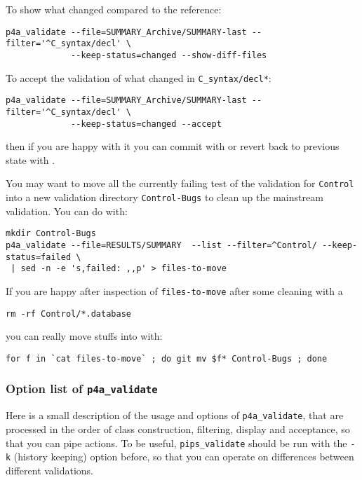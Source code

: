 \documentclass[a4paper]{article}
\begin{document}
To show what changed compared to the reference:
\begin{verbatim}
p4a_validate --file=SUMMARY_Archive/SUMMARY-last --filter='^C_syntax/decl' \
             --keep-status=changed --show-diff-files
\end{verbatim}

To accept the validation of what changed in \texttt{C\_syntax/decl\emph{*}}:
\begin{verbatim}
p4a_validate --file=SUMMARY_Archive/SUMMARY-last --filter='^C_syntax/decl' \
             --keep-status=changed --accept
\end{verbatim}
then if you are happy with it you can commit with \Agit or revert back to
previous state with \Agit.

You may want to move all the currently failing test of the validation for
\texttt{Control} into a new validation directory \texttt{Control-Bugs} to
clean up the mainstream validation. You can do with:
\begin{verbatim}
mkdir Control-Bugs
p4a_validate --file=RESULTS/SUMMARY  --list --filter=^Control/ --keep-status=failed \
 | sed -n -e 's,failed: ,,p' > files-to-move
\end{verbatim}
If you are happy after inspection of \texttt{files-to-move} after some
cleaning with a
\begin{verbatim}
rm -rf Control/*.database
\end{verbatim}
you can really move stuffs into with:
\begin{verbatim}
for f in `cat files-to-move` ; do git mv $f* Control-Bugs ; done
\end{verbatim}


\subsubsection{Option list of \protect\texttt{p4a\_validate}}
\label{sec:opti-list-p4a_v-1}

Here is a small description of the usage and options of
\verb|p4a_validate|, that are processed in the order of class
construction, filtering, display and acceptance, so that you can pipe
actions. To be useful, \verb|pips_validate| should be run with the
\texttt{-k} (history keeping) option before, so that you can operate on
differences between different validations.


\end{document}
